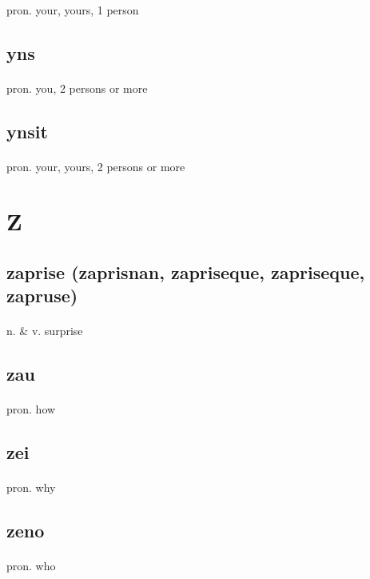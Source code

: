 \documentclass[UTF8]{article}
\begin{document}
    \paragraph{} pron. your, yours, 1 person 
    \subsection{yns}
    \paragraph{} pron. you, 2 persons or more 
    \subsection{ynsit}
    \paragraph{} pron. your, yours, 2 persons or more 
    \newpage \section{Z}
    \subsection{zaprise (zaprisnan, zapriseque, zapriseque, zapruse)}
    \paragraph{} n. \& v. surprise 
    \subsection{zau}
    \paragraph{} pron. how 
    \subsection{zei}
    \paragraph{} pron. why 
    \subsection{zeno}
    \paragraph{} pron. who 
\end{document}
